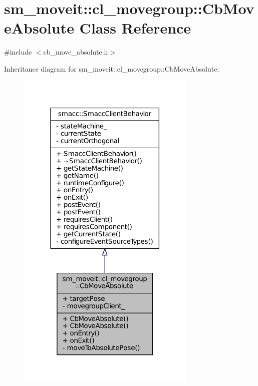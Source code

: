 \hypertarget{classsm__moveit_1_1cl__movegroup_1_1CbMoveAbsolute}{}\section{sm\+\_\+moveit\+:\+:cl\+\_\+movegroup\+:\+:Cb\+Move\+Absolute Class Reference}
\label{classsm__moveit_1_1cl__movegroup_1_1CbMoveAbsolute}


{\ttfamily \#include $<$cb\+\_\+move\+\_\+absolute.\+h$>$}



Inheritance diagram for sm\+\_\+moveit\+:\+:cl\+\_\+movegroup\+:\+:Cb\+Move\+Absolute\+:
\nopagebreak
\begin{figure}[H]
\begin{center}
\leavevmode
\includegraphics[width=242pt]{classsm__moveit_1_1cl__movegroup_1_1CbMoveAbsolute__inherit__graph}
\end{center}
\end{figure}


